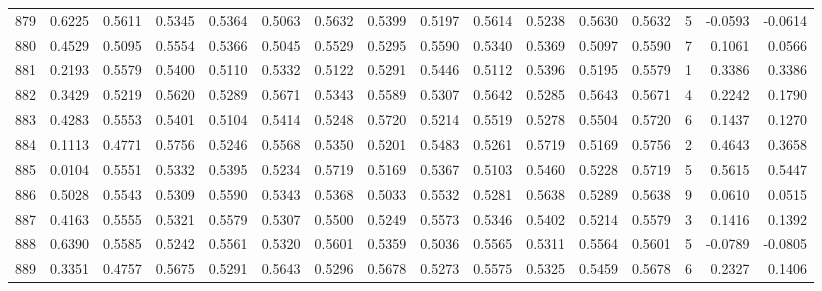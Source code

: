 \begin{tabular}{lrrrrrrrrrrrrrrr}
879 &      0.6225 &  0.5611 &  0.5345 &  0.5364 &  0.5063 &  0.5632 &  0.5399 &  0.5197 &  0.5614 &  0.5238 &   0.5630 &     0.5632 &      5 &                   -0.0593 &                    -0.0614 \\
880 &      0.4529 &  0.5095 &  0.5554 &  0.5366 &  0.5045 &  0.5529 &  0.5295 &  0.5590 &  0.5340 &  0.5369 &   0.5097 &     0.5590 &      7 &                    0.1061 &                     0.0566 \\
881 &      0.2193 &  0.5579 &  0.5400 &  0.5110 &  0.5332 &  0.5122 &  0.5291 &  0.5446 &  0.5112 &  0.5396 &   0.5195 &     0.5579 &      1 &                    0.3386 &                     0.3386 \\
882 &      0.3429 &  0.5219 &  0.5620 &  0.5289 &  0.5671 &  0.5343 &  0.5589 &  0.5307 &  0.5642 &  0.5285 &   0.5643 &     0.5671 &      4 &                    0.2242 &                     0.1790 \\
883 &      0.4283 &  0.5553 &  0.5401 &  0.5104 &  0.5414 &  0.5248 &  0.5720 &  0.5214 &  0.5519 &  0.5278 &   0.5504 &     0.5720 &      6 &                    0.1437 &                     0.1270 \\
884 &      0.1113 &  0.4771 &  0.5756 &  0.5246 &  0.5568 &  0.5350 &  0.5201 &  0.5483 &  0.5261 &  0.5719 &   0.5169 &     0.5756 &      2 &                    0.4643 &                     0.3658 \\
885 &      0.0104 &  0.5551 &  0.5332 &  0.5395 &  0.5234 &  0.5719 &  0.5169 &  0.5367 &  0.5103 &  0.5460 &   0.5228 &     0.5719 &      5 &                    0.5615 &                     0.5447 \\
886 &      0.5028 &  0.5543 &  0.5309 &  0.5590 &  0.5343 &  0.5368 &  0.5033 &  0.5532 &  0.5281 &  0.5638 &   0.5289 &     0.5638 &      9 &                    0.0610 &                     0.0515 \\
887 &      0.4163 &  0.5555 &  0.5321 &  0.5579 &  0.5307 &  0.5500 &  0.5249 &  0.5573 &  0.5346 &  0.5402 &   0.5214 &     0.5579 &      3 &                    0.1416 &                     0.1392 \\
888 &      0.6390 &  0.5585 &  0.5242 &  0.5561 &  0.5320 &  0.5601 &  0.5359 &  0.5036 &  0.5565 &  0.5311 &   0.5564 &     0.5601 &      5 &                   -0.0789 &                    -0.0805 \\
889 &      0.3351 &  0.4757 &  0.5675 &  0.5291 &  0.5643 &  0.5296 &  0.5678 &  0.5273 &  0.5575 &  0.5325 &   0.5459 &     0.5678 &      6 &                    0.2327 &                     0.1406 \\

\end{tabular}
